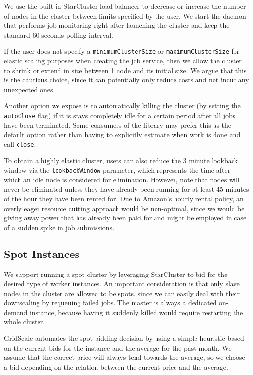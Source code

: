 We use the built-in StarCluster load balancer to decrease or increase the number of nodes in the cluster between limits specified by the user. We start the daemon that performs job monitoring right after launching the cluster and keep the standard 60 seconds polling interval. 

If the user does not specify a \verb|minimumClusterSize| or \verb|maximumClusterSize| for elastic scaling purposes when creating the job service, then we allow the cluster to shrink or extend in size between 1 node and its initial size. We argue that this is the cautious choice, since it can potentially only reduce costs and not incur any unexpected ones.

Another option we expose is to automatically killing the cluster (by setting the \verb|autoClose| flag) if it is stays completely idle for a certain period after all jobs have been terminated. Some consumers of the library may prefer this as the default option rather than having to explicitly estimate when work is done and call \verb|close|.

To obtain a highly elastic cluster, users can also reduce the 3 minute lookback window via the \verb|lookbackWindow| parameter, which represents the time after which an idle node is considered for elimination. However, note that nodes will never be eliminated unless they have already been running for at least 45 minutes of the hour they have been rented for. Due to Amazon's hourly rental policy, an overly eager resource cutting approach would be non-optimal, since we would be giving away power that has already been paid for and might be employed in case of a sudden spike in job submissions.

\subsection{Spot Instances}

We support running a spot cluster by leveraging StarCluster to bid for the desired type of worker instances. An important consideration is that only slave nodes in the cluster are allowed to be spots, since we can easily deal with their downscaling by requeuing failed jobs. The master is always a dedicated on-demand instance, because having it suddenly killed would require restarting the whole cluster.

GridScale automates the spot bidding decision by using a simple heuristic based on the current bids for the instance and the average for the past month. We assume that the correct price will always tend towards the average, so we choose a bid depending on the relation between the current price and the average. 

